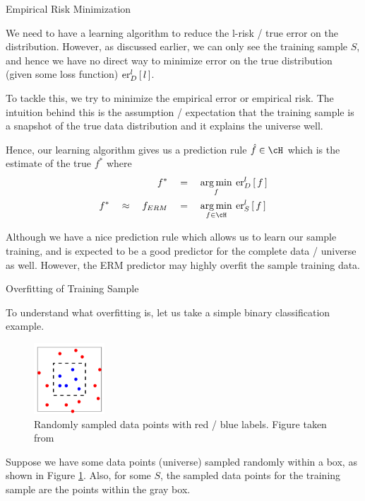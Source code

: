 \documentclass{article}
\begin{document}
\begin{ssection}{Empirical Risk Minimization}

	We need to have a learning algorithm to reduce the l-risk / true error on the distribution. However, as discussed earlier, we can only see the training sample $S$, and hence we have no direct way to minimize error on the true distribution (given some loss function)  $\err[_D^l]{l}$. \br

	To tackle this, we try to minimize the empirical error or empirical risk. The intuition behind this is the assumption / expectation that the training sample is a snapshot of the true data distribution and it explains the universe well. \br

	Hence, our learning algorithm gives us a prediction rule $\hat{f} \in \cH$ which is the estimate of the true $f^\ast$ where
	\begin{align*}
		f^\ast					&\eq	\argmin{f} \err[_D^l]{f} \\
		f^\ast \qapprox f_{ERM}	&\eq	\argmin{f \in \cH} \err[_S^l]{f}
	\end{align*}

	Although we have a nice prediction rule which allows us to learn our sample training, and is expected to be a good predictor for the complete data / universe as well. However, the ERM predictor may highly overfit the sample training data. \br

	\begin{ssubsection}{Overfitting of Training Sample}

		To understand what overfitting is, let us take a simple binary classification example. \br

		\begin{figure}[h!]
			\centering
			\includegraphics[height=100px]{includes/overfitting-example.png}
			\caption{Randomly sampled data points with red / blue labels. Figure taken from \cite{ml-tta}}
			\label{fig:overfitting}
		\end{figure}

		Suppose we have some data points (universe) sampled randomly within a box, as shown in Figure \ref{fig:overfitting}. Also, for some $S$, the sampled data points for the training sample are the points within the gray box. \br


\end{ssubsection}
\end{ssection}
\end{document}
